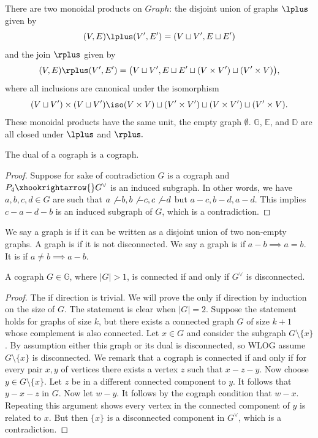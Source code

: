 There are two monoidal products on $Graph$: the disjoint union of graphs $\lplus$ given by $$(V,E)\lplus (V',E')=(V\sqcup V',E\sqcup E')$$ and the join $\rplus$ given by $$(V,E)\rplus (V',E')=\big(V\sqcup V',E\sqcup E'\sqcup (V\times V')\sqcup (V'\times V)\big),$$ where all inclusions are canonical under the isomorphism $$(V\sqcup V')\times (V\sqcup V')\iso (V\times V)\sqcup (V'\times V')\sqcup (V\times V')\sqcup (V'\times V).$$ These monoidal products have the same unit, the empty graph $\emptyset.$ $\mathbb{G}$, $\mathbb{E}$, and $\mathbb{D}$ are all closed under $\lplus$ and $\rplus.$

\begin{lemma}
    The dual of a cograph is a cograph.
\end{lemma}

\begin{proof}
Suppose for sake of contradiction $G$ is a cograph and $P_4\xhookrightarrow{} G^\vee$ is an induced subgraph. In other words, we have $a,b,c,d\in G$ are such that $a\not - b, b\not - c, c\not - d$ but $a-c,b-d,a-d$. This implies $c-a-d-b$ is an induced subgraph of $G$, which is a contradiction.
\end{proof}

\begin{definition}
We say a graph is  if it can be written as a disjoint union of two non-empty graphs. A graph is  if it is not disconnected. We say a graph is  if $a-b\implies a=b$. It is  if $a\neq b\implies a-b$.
\end{definition}

\begin{lemma}
    A cograph $G\in \mathbb{G}$, where $|G|>1$, is connected if and only if $G^{\vee}$ is disconnected.
\end{lemma}

\begin{proof}
    The if direction is trivial. We will prove the only if direction by induction on the size of $G$. The statement is clear when $|G|=2$. Suppose the statement holds for graphs of size $k$, but there exists a connected graph $G$ of size $k+1$ whose complement is also connected. Let $x\in G$ and consider the subgraph $G\setminus \{x\}$. By assumption either this graph or its dual is disconnected, so WLOG assume $G\setminus \{x\}$ is disconnected. We remark that a cograph is connected if and only if for every pair $x,y$ of vertices there exists a vertex $z$ such that $x-z-y$. Now choose $y\in G\setminus \{x\}$. Let $z$ be in a different connected component to $y$. It follows that $y-x-z$ in $G$. Now let $w-y$. It follows by the cograph condition that $w-x$. Repeating this argument shows every vertex in the connected component of $y$ is related to $x$. But then $\{x\}$ is a disconnected component in $G^{\vee}$, which is a contradiction.
\end{proof}

